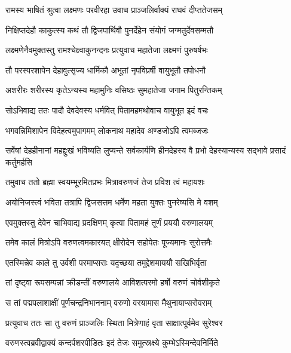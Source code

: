 
\twolineshloka
{रामस्य भाषितं श्रुत्वा लक्ष्मणः परवीरहा}
{उवाच प्राञ्जलिर्वाक्यं राघवं दीप्ततेजसम्} %

\twolineshloka
{निक्षिप्तदेहौ काकुत्स्य कथं तौ द्विजपार्थिवौ}
{पुनर्देहेन संयोगं जग्मतुर्देवसम्मतौ} %

\twolineshloka
{लक्ष्मणेनैवमुक्तस्तु रामश्चेक्ष्वाकुनन्दनः}
{प्रत्युवाच महातेजा लक्ष्मणं पुरुषर्षभः} %

\twolineshloka
{तौ परस्परशापेन देहावुत्सृज्य धार्मिकौ}
{अभूतां नृपविप्रर्षी वायुभूतौ तपोधनौ} %

\twolineshloka
{अशरीरः शरीरस्य कृतेऽन्यस्य महामुनिः}
{वसिष्ठः सुमहातेजा जगाम पितुरन्तिकम्} %

\twolineshloka
{सोऽभिवाद्य ततः पादौ देवदेवस्य धर्मवित्}
{पितामहमथोवाच वायुभूत इदं वचः} %

\twolineshloka
{भगवन्निमिशापेन विदेहत्वमुपागमम्}
{लोकनाथ महादेव अण्डजोऽपि त्वमब्जजः} %

\threelineshloka
{सर्वेषां देहहीनानां महद्दुःखं भविष्यति}
{लुप्यन्ते सर्वकार्यणि हीनदेहस्य वै प्रभो}
{देहस्यान्यस्य सद्भावे प्रसादं कर्तुमर्हसि} %

\twolineshloka
{तमुवाच ततो ब्रह्मा स्वयम्भूरमितप्रभः}
{मित्रावरुणजं तेज प्रविश त्वं महायशः} %

\twolineshloka
{अयोनिजस्त्वं भविता तत्रापि द्विजसत्तम}
{धर्मेण महता युक्तः पुनरेष्यसि मे वशम्} %

\twolineshloka
{एवमुक्तस्तु देवेन चाभिवाद्य प्रदक्षिणम्}
{कृत्वा पितामहं तूर्णं प्रययौ वरुणालयम्} %

\twolineshloka
{तमेव कालं मित्रोऽपि वरुणत्वमकारयत्}
{क्षीरोदेन सहोपेतः पूज्यमानः सुरोत्तमैः} %

\twolineshloka
{एतस्मिन्नेव काले तु उर्वशी परमाप्सराः}
{यदृच्छया तमुद्देशमाययौ सखिभिर्वृता} %

\twolineshloka
{तां दृष्ट्वा रूपसम्पन्नां क्रीडन्तीं वरुणालये}
{आविशत्परमो हर्षो वरुणं चोर्वशीकृते} %

\twolineshloka
{स तां पद्मपलाशाक्षीं पूर्णचन्द्रनिभाननाम्}
{वरुणो वरयामास मैथुनायाप्सरोवराम्} %

\twolineshloka
{प्रत्युवाच ततः सा तु वरुणं प्राञ्जलिः स्थिता}
{मित्रेणाहं वृता साक्षात्पूर्वमेव सुरेश्वर} %

\twolineshloka
{वरुणस्त्वब्रवीद्वाक्यं कन्दर्पशरपीडितः}
{इदं तेजः समुत्स्रक्ष्ये कुम्भेऽस्मिन्देवनिर्मिते} %

